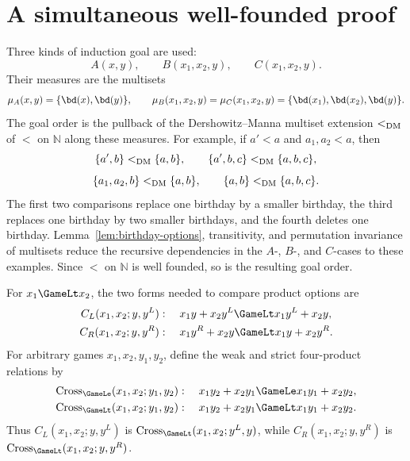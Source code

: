 \section{A simultaneous well-founded proof}

\begin{definition}
  \label{def:dm-goals}
  \leanok
  Three kinds of induction goal are used:
  \[
    A(x,y),\qquad B(x_1,x_2,y),\qquad C(x_1,x_2,y).
  \]
  Their measures are the multisets
  \[
    \mu_A(x,y)=\{\bd(x),\bd(y)\},\qquad
    \mu_B(x_1,x_2,y)=\mu_C(x_1,x_2,y)
      =\{\bd(x_1),\bd(x_2),\bd(y)\}.
  \]
  The goal order is the pullback of the Dershowitz--Manna multiset extension
  \(<_{\rm DM}\) of \(<\) on \(\mathbb N\) along these measures.  For example,
  if \(a'<a\) and \(a_1,a_2<a\), then
  \[
    \{a',b\}<_{\rm DM}\{a,b\},\qquad
    \{a',b,c\}<_{\rm DM}\{a,b,c\},
  \]
  \[
    \{a_1,a_2,b\}<_{\rm DM}\{a,b\},\qquad
    \{a,b\}<_{\rm DM}\{a,b,c\}.
  \]
  The first two comparisons replace one birthday by a smaller birthday, the
  third replaces one birthday by two smaller birthdays, and the fourth deletes
  one birthday.  Lemma~\ref{lem:birthday-options}, transitivity, and permutation
  invariance of multisets reduce the recursive dependencies in the
  \(A\)-, \(B\)-, and \(C\)-cases to these examples.  Since \(<\) on
  \(\mathbb N\) is well founded, so is the resulting goal order.
\end{definition}

\begin{definition}
  \label{def:cross-conditions}
  \leanok
  For \(x_1\GameLt x_2\), the two forms needed to compare product options are
  \[
    \begin{aligned}
      C_L(x_1,x_2;y,y^L)&:\quad
        x_1y+x_2y^L\GameLt x_1y^L+x_2y,\\
      C_R(x_1,x_2;y,y^R)&:\quad
        x_1y^R+x_2y\GameLt x_1y+x_2y^R.
    \end{aligned}
  \]
  For arbitrary games \(x_1,x_2,y_1,y_2\), define the weak and strict
  four-product relations by
  \[
    \begin{aligned}
      \operatorname{Cross}_{\GameLe}(x_1,x_2;y_1,y_2)&:\quad
        x_1y_2+x_2y_1\GameLe x_1y_1+x_2y_2,\\
      \operatorname{Cross}_{\GameLt}(x_1,x_2;y_1,y_2)&:\quad
        x_1y_2+x_2y_1\GameLt x_1y_1+x_2y_2.
    \end{aligned}
  \]
  Thus \(C_L(x_1,x_2;y,y^L)\) is
  \(\operatorname{Cross}_{\GameLt}(x_1,x_2;y^L,y)\), while
  \(C_R(x_1,x_2;y,y^R)\) is
  \(\operatorname{Cross}_{\GameLt}(x_1,x_2;y,y^R)\).
\end{definition}

